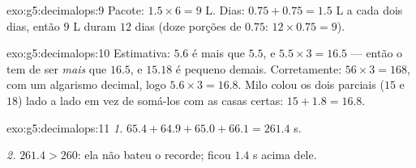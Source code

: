 \begin{solution}{exo:g5:decimalops:9}
Pacote: $1.5 \times 6 = 9$ L. Dias: $0.75 + 0.75 = 1.5$ L a cada dois
dias, então $9$ L duram $12$ dias (doze porções de $0.75$:
$12 \times 0.75 = 9$).
\end{solution}

\begin{solution}{exo:g5:decimalops:10}
Estimativa: $5.6$ é mais que $5.5$, e $5.5 \times 3 = 16.5$ --- então
o  tem de ser \emph{mais} que $16.5$, e $15.18$ é pequeno
demais. Corretamente: $56 \times 3 = 168$, com um algarismo decimal,
logo $5.6 \times 3 = 16.8$. Milo colou os dois  parciais
($15$ e $18$) lado a lado em vez de somá-los com as casas certas:
$15 + 1.8 = 16.8$.
\end{solution}

\begin{solution}{exo:g5:decimalops:11}
\emph{1.} $65.4 + 64.9 + 65.0 + 66.1 = 261.4$ s.

\emph{2.} $261.4 > 260$: ela não bateu o recorde; ficou $1.4$ s
acima dele.
\end{solution}
